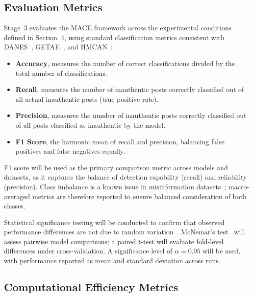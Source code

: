 \subsection{Evaluation Metrics}

Stage~3 evaluates the MACE framework across the experimental conditions defined in Section~4, using standard classification metrics consistent with DANES~\citep{truica2024danes}, GETAE~\citep{GETAE2025}, and HMCAN~\citep{Qian2021, su_wan_liu_huang_2020}:

\begin{itemize}
    \item \textbf{Accuracy}, measures the number of correct classifications divided by the total number of classifications.

    \item \textbf{Recall}, measures the number of inauthentic posts correctly classified out of all actual inauthentic posts (true positive rate).

    \item \textbf{Precision}, measures the number of inauthentic posts correctly classified out of all posts classified as inauthentic by the model.

    \item \textbf{F1 Score}, the harmonic mean of recall and precision, balancing false positives and false negatives equally.
\end{itemize}

F1 score will be used as the primary comparison metric across models and datasets, as it captures the balance of detection capability (recall) and reliability (precision). Class imbalance is a known issue in misinformation datasets~\citep{mumindataset}; macro-averaged metrics are therefore reported to ensure balanced consideration of both classes.

Statistical significance testing will be conducted to confirm that observed performance differences are not due to random variation~\citep{stat_test}. McNemar's test~\citep{McNemar_1947} will assess pairwise model comparisons; a paired t-test will evaluate fold-level differences under cross-validation. A significance level of $\alpha = 0.05$ will be used, with performance reported as mean and standard deviation across runs.

\subsection{Computational Efficiency Metrics}

